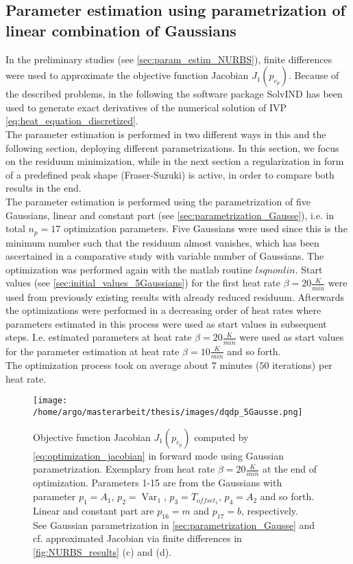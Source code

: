 \documentclass{scrartcl}[12pt, halfparskip]
\numberwithin{equation}{section}
\numberwithin{figure}{section}
\numberwithin{table}{section}
\newcommand{\var}{\operatorname{Var}}
\begin{document}
\subsection{Parameter estimation using parametrization of linear combination of Gaussians}
\label{sec:param_estimation_5Gausse}
In the preliminary studies (see \cref{sec:param_estim_NURBS}), finite differences were used to approximate the objective function Jacobian $J_1(p_{c_p})$. 
Because of the described problems, in the following the software package SolvIND has been used to generate exact derivatives of the numerical solution of IVP \cref{eq:heat_equation_discretized}. \\
The parameter estimation is performed in two different ways in this and the following section, deploying different parametrizations. In this section, we focus on the residuum minimization, while in the next section a regularization in form of a predefined peak shape (Fraser-Suzuki) is active, in order to compare both results in the end. \\
The parameter estimation is performed using the parametrization of five Gaussians, linear and constant part (see \cref{sec:parametrization_Gausse}), i.e. in total $n_p=17$ optimization parameters. 
Five Gaussians were used since this is the minimum number such that the residuum almost vanishes, which has been ascertained in a comparative study with variable number of Gaussians. 
The optimization was performed again with the matlab routine $lsqnonlin$. Start values (see \cref{sec:initial_values_5Gaussians}) for the first heat rate $\beta = 20 \frac{K}{min}$ were used from previously existing results with already reduced residuum. 
Afterwards the optimizations were performed in a decreasing order of heat rates where parameters estimated in this process were used as start values in subsequent steps. 
I.e. estimated parameters at heat rate $\beta=20 \frac{K}{min}$ were used as start values for the parameter estimation at heat rate $\beta=10 \frac{K}{min}$ and so forth. \\
The optimization process took on average about $7$ minutes ($50$ iterations) per heat rate.


\begin{figure}[H]
	\centering
	\texttt{[image: /home/argo/masterarbeit/thesis/images/dqdp\_5Gausse.png]}
	\caption{Objective function Jacobian $J_1(p_{c_p})$ computed by \cref{eq:optimization_jacobian} in forward mode using Gaussian parametrization. Exemplary from heat rate $\beta=20 \frac{K}{min}$ at the end of optimization. Parameters 1-15 are from the Gaussians with parameter $p_1 = A_1$, $p_2 = \var_1$, $p_3 = T_{offset_1}$, $p_4 = A_2$ and so forth. Linear and constant part are $p_{16}=m$ and $p_{17}=b$, respectively. \\
	See Gaussian parametrization in \cref{sec:parametrization_Gausse} and cf. approximated Jacobian via finite differences in \cref{fig:NURBS_results} (c) and (d).}
	\label{fig:dqdp_5Gausse}
\end{figure}
\end{document}
